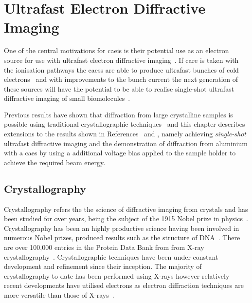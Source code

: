\chapter{Ultrafast Electron Diffractive Imaging}\label{chapter:diffraction}

One of the central motivations for \gls{caeis} is their potential use as an electron source for use with ultrafast electron diffractive imaging~\cite{speirs_single-shot_2015,van_der_geer_ultracold_2009}.
If care is taken with the ionisation pathways the \glspl{caes} are able to produce ultrafast bunches of cold electrons~\cite{speirs_single-shot_2015,speirs_identification_2017,speirs_electron_2017} and with improvements to the bunch current the next generation of these sources will have the potential to be able to realise single-shot ultrafast diffractive imaging of small biomolecules~\cite{mcculloch_cold_2016}.

Previous results have shown that diffraction from large crystalline samples is possible using traditional crystallographic techniques~\cite{speirs_single-shot_2015} and this chapter describes extensions to the results shown in References~\cite{speirs_single-shot_2015} and \cite{speirs_electron_2017}, namely achieving \emph{single-shot} ultrafast diffractive imaging and the demonstration of diffraction from aluminium with a \gls{caes} by using a additional voltage bias applied to the sample holder to achieve the required beam energy.

\section{Crystallography}

Crystallography refers the the science of diffractive imaging from crystals and has been studied for over \unit[100]{years}, being the subject of the 1915 Nobel prize in physics~\cite{bragg_structure_1913}.
Crystallography has been an highly productive science having been involved in numerous Nobel prizes, produced results such as the structure of DNA~\cite{franklin_structure_1953,dennis_eternal_2003}.
There are over 100,000 entries in the Protein Data Bank from from X-ray crystallography~\cite{noauthor_pdb_nodate}.
Crystallographic techniques have been under constant development and refinement since their inception.
The majority of crystallography to date has been performed using X-rays however relatively recent developments have utilised electrons as electron diffraction techniques are more versatile than those of X-rays~\cite{cowley_electron_1992}.

